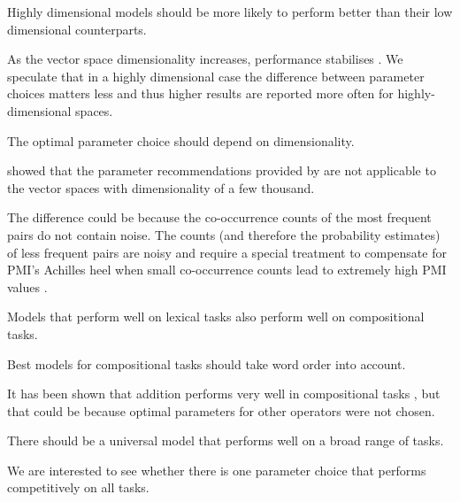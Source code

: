 \begin{hyp}
\label{hyp:var}
Highly dimensional models should be more likely to perform better than their low dimensional counterparts.
\end{hyp}

As the vector space dimensionality increases, performance stabilises \cite{kiela-clark:2014:CVSC,BullinariaLevy2012,lapesa2014large}. We speculate that in a highly dimensional case the difference between parameter choices matters less and thus higher results are reported more often for highly-dimensional spaces.

\begin{hyp}
\label{hyp:dimen}
The optimal parameter choice should depend on dimensionality.
\end{hyp}

 showed that the parameter recommendations provided by  are not applicable to the vector spaces with dimensionality of a few thousand.

The difference could be because the co-occurrence counts of the most frequent pairs do not contain noise. The counts (and therefore the probability estimates) of less frequent pairs are noisy and require a special treatment to compensate for PMI's Achilles heel when small co-occurrence counts lead to extremely high PMI values \cite{TACL570}.

\begin{hyp}
\label{hyp:not-lextocomp}
Models that perform well on lexical tasks also perform well on compositional tasks.
\end{hyp}

\begin{hyp}
\label{hyp:order}
Best models for compositional tasks should take word order into account.
\end{hyp}

It has been shown that addition performs very well in compositional tasks \cite{milajevs-EtAl:2014:EMNLP2014}, but that could be because optimal parameters for other operators were not chosen.

\begin{hyp}
\label{hyp:universal}
There should be a universal model that performs well on a broad range of tasks.
\end{hyp}

We are interested to see whether there is one parameter choice that performs competitively on all tasks.

